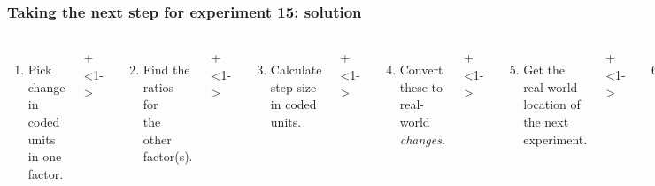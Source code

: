 \documentclass[handout,11pt,aspectratio=169,mathserif]{beamer}
\begin{document}
\begin{frame}\frametitle{Taking the next step for experiment 15: {\color{myOrange}solution}}
	\begin{columns}[T]
		
			\vspace{0.1cm}
			{\tiny 
				\begin{enumerate}
					\item	Pick change in coded units in one factor.
				\end{enumerate}
			 \par}
			 
			\onslide+<1->{
				{\tiny 
					\begin{enumerate}\setcounter{enumi}{1}
						\item	Find the ratios for\\ the other factor(s).
					\end{enumerate}
				
				\par}
			}
			
			\vspace{0.0cm}
			\onslide+<1->{
				{\tiny 
					\begin{enumerate}\setcounter{enumi}{2}
						\item	Calculate step size in coded units.
					\end{enumerate}
				
				\par}
			}
			
			\onslide+<1->{
				{\tiny 
					\begin{enumerate}\setcounter{enumi}{3}
						\item	Convert these to real-world \emph{changes}.
					\end{enumerate}
				
				\par}
			}
			
			\onslide+<1->{
				{\tiny 
					\begin{enumerate}\setcounter{enumi}{4}
						\item	Get the real-world location
						of the next experiment.
					\end{enumerate}
				
				\par}
			}
			
			
			\vspace{-0.2cm}
			\onslide+<1->{
				{\tiny 
					\begin{enumerate}\setcounter{enumi}{5}
						\item	Convert these back\\ to coded-units.
					\end{enumerate}
				
}}
\end{columns}
\end{frame}
\end{document}
